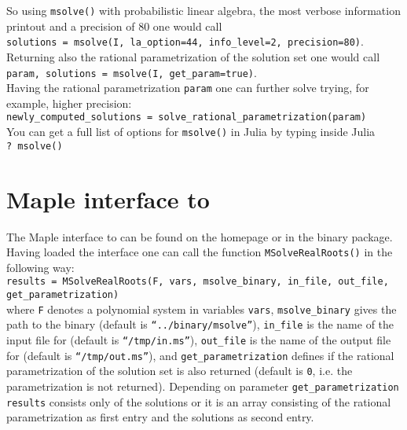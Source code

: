 \documentclass[a4paper,english,11pt]{scrartcl}
\theoremstyle{definition}
\theoremstyle{remark}
\begin{document}
So using \texttt{msolve()} with probabilistic linear algebra, the most verbose
information printout and a precision of $80$ one would call\\[1em]
\texttt{solutions = msolve(I, la\_option=44, info\_level=2,
precision=80)}.\\[1em]
Returning also the rational parametrization of the solution set one would
call\\[1em]
\texttt{param, solutions = msolve(I, get\_param=true)}.\\[1em]
Having the rational parametrization \texttt{param} one can further solve trying,
for example, higher precision:\\[1em]
\texttt{newly\_computed\_solutions = solve\_rational\_parametrization(param)}\\[1em]
You can get a full list of options for \texttt{msolve()} in Julia by typing
inside Julia\\[1em]
\texttt{? msolve()}
\section{Maple interface to \msolve}
The Maple interface to \msolve can be found on the \msolve homepage or in the
\msolve binary package.
Having loaded the interface one can call the function
\texttt{MSolveRealRoots()} in the following way:\\[1em]
\texttt{results = MSolveRealRoots(F, vars, msolve\_binary, in\_file, out\_file, get\_parametrization)}\\[1em]
    where \texttt{F} denotes a polynomial system in variables \texttt{vars},
    \texttt{msolve\_binary} gives the path to the binary (default is
    \texttt{“../binary/msolve”}), 
\texttt{in\_file} is the name of the input file for \msolve (default is
\texttt{“/tmp/in.ms”}), 
\texttt{out\_file} is the name of the output file for \msolve (default is
\texttt{“/tmp/out.ms”}), and 
\texttt{get\_parametrization} defines if the rational parametrization of the
solution set is also returned (default is
\texttt{0}, i.e. the parametrization is not returned). 
 Depending on parameter \texttt{get\_parametrization}
\texttt{results} consists only of the solutions or it is an array consisting of
the rational parametrization as first entry and the solutions as second entry.
\end{document}
